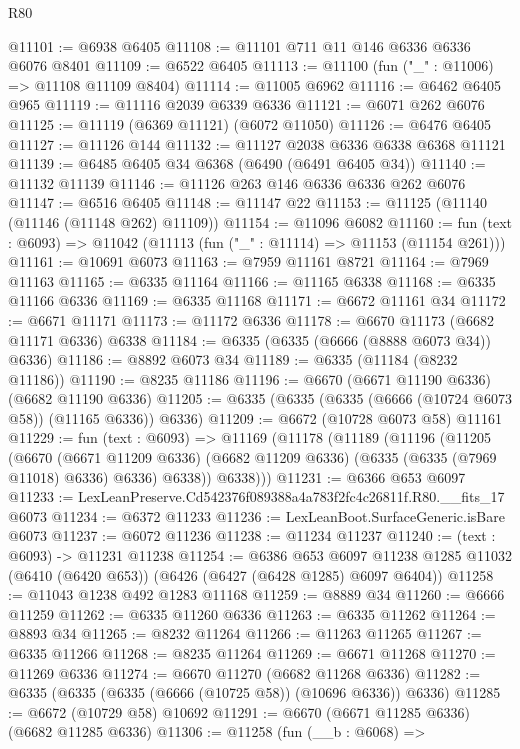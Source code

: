 \begin{lexlean}{R80}
\begin{coremodule}
@11101 := @6938 @6405
@11108 := @11101 @711 @11 @146 @6336 @6336 @6076 @8401
@11109 := @6522 @6405
@11113 := @11100 (fun ("_" : @11006) => @11108 @11109 @8404)
@11114 := @11005 @6962
@11116 := @6462 @6405 @965
@11119 := @11116 @2039 @6339 @6336
@11121 := @6071 @262 @6076
@11125 := @11119 (@6369 @11121) (@6072 @11050)
@11126 := @6476 @6405
@11127 := @11126 @144
@11132 := @11127 @2038 @6336 @6338 @6368 @11121
@11139 := @6485 @6405 @34 @6368 (@6490 (@6491 @6405 @34))
@11140 := @11132 @11139
@11146 := @11126 @263 @146 @6336 @6336 @262 @6076
@11147 := @6516 @6405
@11148 := @11147 @22
@11153 := @11125 (@11140 (@11146 (@11148 @262) @11109))
@11154 := @11096 @6082
@11160 := fun (text : @6093) => @11042 (@11113 (fun ("_" : @11114) => @11153 (@11154 @261)))
@11161 := @10691 @6073
@11163 := @7959 @11161 @8721
@11164 := @7969 @11163
@11165 := @6335 @11164
@11166 := @11165 @6338
@11168 := @6335 @11166 @6336
@11169 := @6335 @11168
@11171 := @6672 @11161 @34
@11172 := @6671 @11171
@11173 := @11172 @6336
@11178 := @6670 @11173 (@6682 @11171 @6336) @6338
@11184 := @6335 (@6335 (@6666 (@8888 @6073 @34)) @6336)
@11186 := @8892 @6073 @34
@11189 := @6335 (@11184 (@8232 @11186))
@11190 := @8235 @11186
@11196 := @6670 (@6671 @11190 @6336) (@6682 @11190 @6336)
@11205 := @6335 (@6335 (@6335 (@6666 (@10724 @6073 @58)) (@11165 @6336)) @6336)
@11209 := @6672 (@10728 @6073 @58) @11161
@11229 := fun (text : @6093) =>
  @11169
    (@11178
      (@11189
        (@11196
          (@11205
            (@6670
              (@6671 @11209 @6336)
              (@6682 @11209 @6336)
              (@6335 (@6335 (@7969 @11018) @6336) @6336)
              @6338))
          @6338)))
@11231 := @6366 @653 @6097
@11233 := LexLeanPreserve.Cd542376f089388a4a783f2fc4c26811f.R80.__fits_17 @6073
@11234 := @6372 @11233
@11236 := LexLeanBoot.SurfaceGeneric.isBare @6073
@11237 := @6072 @11236
@11238 := @11234 @11237
@11240 := (text : @6093) -> @11231 @11238
@11254 := @6386
    @653
    @6097
    @11238
    @1285
    @11032
    (@6410 (@6420 @653))
    (@6426 (@6427 (@6428 @1285) @6097 @6404))
@11258 := @11043 @1238 @492 @1283 @11168
@11259 := @8889 @34
@11260 := @6666 @11259
@11262 := @6335 @11260 @6336
@11263 := @6335 @11262
@11264 := @8893 @34
@11265 := @8232 @11264
@11266 := @11263 @11265
@11267 := @6335 @11266
@11268 := @8235 @11264
@11269 := @6671 @11268
@11270 := @11269 @6336
@11274 := @6670 @11270 (@6682 @11268 @6336)
@11282 := @6335 (@6335 (@6335 (@6666 (@10725 @58)) (@10696 @6336)) @6336)
@11285 := @6672 (@10729 @58) @10692
@11291 := @6670 (@6671 @11285 @6336) (@6682 @11285 @6336)
@11306 := @11258
    (fun (__b : @6068) =>

\end{coremodule}
\end{lexlean}
